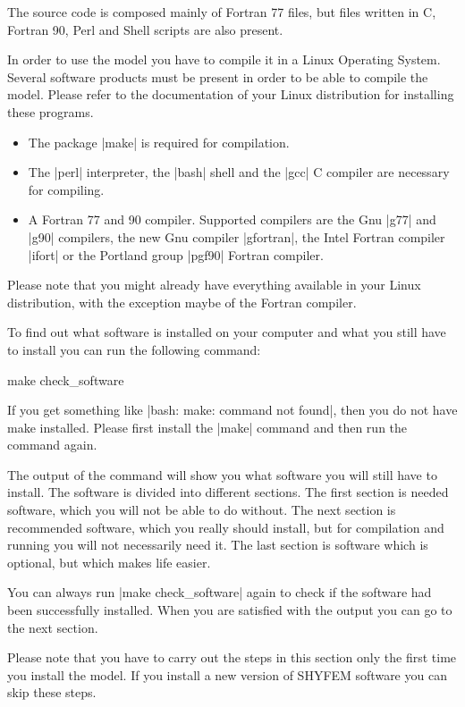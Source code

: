 
The source code is composed mainly of Fortran 77 files, but files written
in C, Fortran 90, Perl and Shell scripts are also present.

In order to use the model you have to compile it in a Linux Operating
System. Several software products must be present in order to be able
to compile the model. Please refer to the documentation of your Linux
distribution for installing these programs.

\begin{itemize}

\item The package |make| is required for compilation.

\item The |perl| interpreter, the |bash| shell and the |gcc| C compiler
are necessary for compiling.

\item A Fortran 77 and 90 compiler. Supported compilers are the Gnu |g77|
and |g90| compilers, the new Gnu compiler |gfortran|, the Intel Fortran
compiler |ifort| or the Portland group |pgf90| Fortran compiler.

\end{itemize}

Please note that you might already have everything available in your
Linux distribution, with the exception maybe of the Fortran compiler.

To find out what software is installed on your computer and what you
still have to install you can run the following command:

\begin{code}
    make check_software
\end{code}

If you get something like |bash: make: command not found|, then you do
not have make installed. Please first install the |make| command and
then run the command again.

The output of the command will show you what software you will still have
to install. The software is divided into different sections. The first
section is needed software, which you will not be able to do without. The
next section is recommended software, which you really should install,
but for compilation and running you will not necessarily need it. The
last section is software which is optional, but which makes life easier.

You can always run |make check_software| again to check if the software
had been successfully installed. When you are satisfied with the output
you can go to the next section.

Please note that you have to carry out the steps in this section only
the first time you install the model. If you install a new version of
SHYFEM software you can skip these steps.




